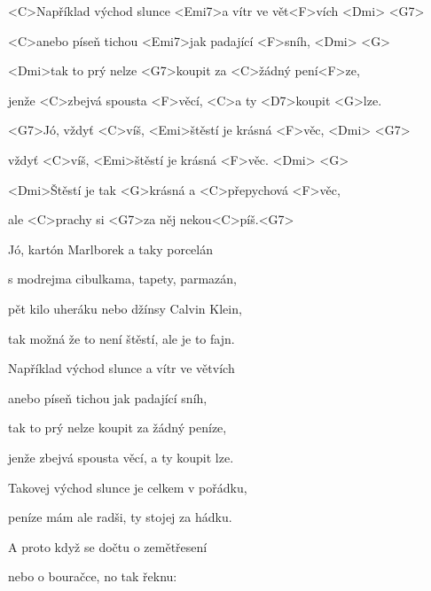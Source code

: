 

\zs
<C>Například východ slunce <Emi7>a vítr ve vět<F>vích <Dmi> <G7>

<C>anebo píseň tichou <Emi7>jak padající <F>sníh, <Dmi> <G>

<Dmi>tak to prý nelze <G7>koupit za <C>žádný pení<F>ze,

jenže <C>zbejvá spousta <F>věcí, <C>a ty <D7>koupit <G>lze.
\ks

\zs
<G7>Jó, vždyť <C>víš, <Emi>štěstí je krásná <F>věc, <Dmi> <G7>

vždyť <C>víš, <Emi>štěstí je krásná <F>věc. <Dmi> <G>

<Dmi>Štěstí je tak <G>krásná a <C>přepychová <F>věc,

ale <C>prachy si <G7>za něj nekou<C>píš.<G7>
\ks

\zs
Jó, kartón Marlborek a taky porcelán

s modrejma cibulkama, tapety, parmazán,

pět kilo uheráku nebo džínsy Calvin Klein,

tak možná že to není štěstí, ale je to fajn.
\ks

\zr
Například východ slunce a vítr ve větvích

anebo píseň tichou jak padající sníh,

tak to prý nelze koupit za žádný peníze,

jenže zbejvá spousta věcí, a ty koupit lze.
\kr

\zs
Takovej východ slunce je celkem v pořádku,

peníze mám ale radši, ty stojej za hádku.

A proto když se dočtu o zemětřesení

nebo o bouračce, no tak řeknu: 
\ks

\zr \kr \zr \kr

\kp
